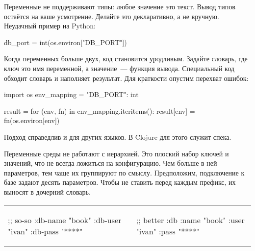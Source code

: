 
Переменные не поддерживают типы: любое значение это текст. Вывод типов остаётся
на ваше усмотрение. Делайте это декларативно, а не вручную. Неудачный пример на
Python:


\begin{english}
  \begin{python}
db_port = int(os.environ["DB_PORT"])
  \end{python}
\end{english}

Когда переменных больше двух, код становится уродливым. Задайте словарь, где
ключ это имя переменной, а значение~--- функция вывода. Специальный код обходит
словарь и наполняет результат. Для краткости опустим перехват ошибок:

\begin{english}
  \begin{python}
import os
env_mapping = {"DB_PORT": int}

result = {}
for (env, fn) in env_mapping.iteritems():
    result[env] = fn(os.environ[env])
  \end{python}
\end{english}

\noindent
Подход справедлив и для других языков. В Clojure для этого служит спека.

Переменные среды не работают с иерархией. Это плоский набор ключей и значений,
что не всегда ложиться на конфигурацию. Чем больше в ней параметров, тем чаще их
группируют по смыслу. Предположим, подключение к базе задают десять
параметров. Чтобы не ставить перед каждым префикс, их выносят в дочерний
словарь.


\noindent
\begin{tabular}{ @{}p{5cm} @{}p{5cm} }

\begin{english}
  \begin{clojure}
;; so-so
{:db-name "book"
 :db-user "ivan"
 :db-pass "****"}
  \end{clojure}
\end{english}

&

\begin{english}
  \begin{clojure}
;; better
{:db {:name "book"
      :user "ivan"
      :pass "****"}}
  \end{clojure}
\end{english}

\end{tabular}

